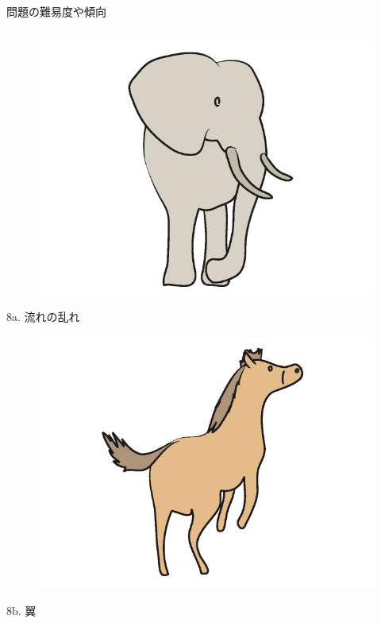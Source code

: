 \documentclass[dvipdfmx]{beamer}
\newenvironment{wideitemize}{\itemize\setlength{\itemsep}{1em}}{\enditemize}
\begin{document}
\begin{frame}{問題の難易度や傾向}
\begin{columns}[t]
\begin{column}{0.5\textwidth}
\begin{wideitemize}
\begin{figure}[htbp]
    \includegraphics[bb=0 0 6.4 4.8, scale=0.08]{img/a07.jpg}
\end{figure}
\item[8a.] 流れの乱れ
\begin{figure}[htbp]
    \centering
    \includegraphics[bb=0 0 6.4 4.8, scale=0.09]{img/a08.jpg}
\end{figure}
\item[8b.] 翼
\begin{figure}[htbp]
    \centering

\end{figure}
\end{wideitemize}
\end{column}
\end{columns}
\end{frame}
\end{document}
